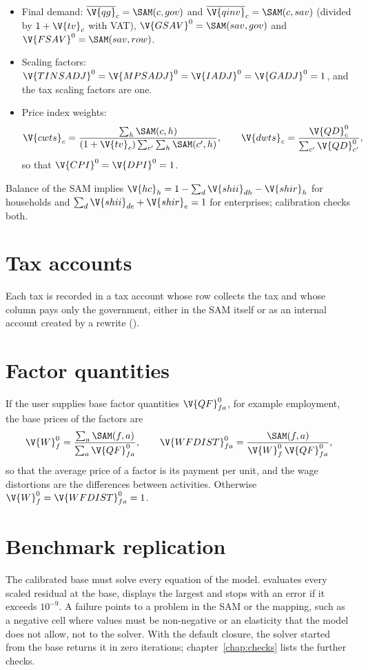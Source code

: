 \begin{itemize}
$\V{trnsfr}_{gov,gov} = \SAM(gov, gov)$, $\V{trnsfr}_{d,row} = \SAM(d, row)$,
$\V{trnsfr}_{f,row} = \SAM(f, row)$, $\V{trnsfr}_{gov,row} = \SAM(gov, row)$ and
$\V{trnsfr}_{row,gov} = \SAM(row, gov)$ (with public debt, the interest is
separated from them; ).
\item Final demand: $\overline{\V{qg}}_c = \SAM(c, gov)$ and
$\overline{\V{qinv}}_c = \SAM(c, sav)$ (divided by $1 + \V{tv}_c$ with VAT),
$\V{GSAV}^0 = \SAM(sav, gov)$ and $\V{FSAV}^0 = \SAM(sav, row)$.
\item Scaling factors: $\V{TINSADJ}^0 = \V{MPSADJ}^0 = \V{IADJ}^0 = \V{GADJ}^0 = 1$,
and the tax scaling factors are one.
\item Price index weights:
\begin{equation*}
\V{cwts}_c = \frac{\sum_h \SAM(c, h)}{(1 + \V{tv}_c) \sum_{c'} \sum_h \SAM(c', h)},
\qquad
\V{dwts}_c = \frac{\V{QD}^0_c}{\sum_{c'} \V{QD}^0_{c'}},
\end{equation*}
so that $\V{CPI}^0 = \V{DPI}^0 = 1$.
\end{itemize}
Balance of the SAM implies $\V{hc}_h = 1 - \sum_d \V{shii}_{dh} - \V{shir}_h$
for households and $\sum_d \V{shii}_{de} + \V{shir}_e = 1$ for enterprises;
calibration checks both.

\section{Tax accounts}

Each tax is recorded in a tax account whose row collects the tax and whose
column pays only the government, either in the SAM itself or as an internal
account created by a rewrite ().

\section{Factor quantities}\label{sec:factor-quantities}

If the user supplies base factor quantities $\V{QF}^0_{fa}$, for example
employment, the base prices of the factors are
\begin{equation*}
\V{W}^0_f = \frac{\sum_a \SAM(f, a)}{\sum_a \V{QF}^0_{fa}},
\qquad
\V{WFDIST}^0_{fa} = \frac{\SAM(f, a)}{\V{W}^0_f\,\V{QF}^0_{fa}},
\end{equation*}
so that the average price of a factor is its payment per unit, and the wage
distortions are the differences between activities. Otherwise
$\V{W}^0_f = \V{WFDIST}^0_{fa} = 1$.

\section{Benchmark replication}

The calibrated base must solve every equation of the model. 
evaluates every scaled residual at the base, displays the largest and stops
with an error if it exceeds $10^{-9}$. A failure points to a problem in the
SAM or the mapping, such as a negative cell where values must be
non-negative or an elasticity that the model does not allow, not to the
solver. With the default closure, the solver started from the base returns it
in zero iterations; chapter~\ref{chap:checks} lists the further checks.
